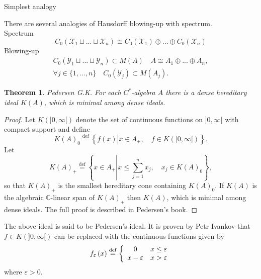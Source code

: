 \documentclass{beamer}
\theoremstyle{plain}
\newtheorem{empt}{}
\newtheorem{thm}{Theorem}%
\newcommand{\be}{\begin{equation}}
\newcommand{\ee}{\end{equation}}
\newcommand{\C}{\mathbb{C}}
\newcommand{\eps}{\varepsilon}                    %
\newcommand{\sX}{\mathcal{X}}       %
\newcommand{\sY}{\mathcal{Y}}       %
\newcommand{\bean}{\begin{eqnarray*}}
\newcommand{\eean}{\end{eqnarray*}}
\newcommand{\bydef}{\stackrel{\mathrm{def}}{=}}
\begin{document}
\begin{frame}
	\begin{center}
	{\huge{Simplest analogy} }%
	\end{center}
There are several  analogies of Hausdorff blowing-up  with spectrum.\\
Spectrum
$$
C_0\left(\sX_1\sqcup ...\sqcup \sX_n \right) \cong C_0\left(\sX_1 \right) \oplus ...\oplus C_0\left(\sX_n \right) 
$$
Blowing-up
\bean
C_0\left( \sY_1\sqcup ...\sqcup \sY_n\right)\subset M\left( A\right)\quad   
A \cong A_1\oplus ...\oplus A_n,\\
\forall j \in \{1,...,n\}\quad C_0\left(\sY_j \right) \subset M\left(A_j \right). 
\eean
\end{frame}
\begin{frame}
	\begin{thm}\label{pedersen_ideal_thm} \alert{Pedersen G.K.}
		For each $C^*$-algebra $A$ there is a dense hereditary ideal $K(A)$,
		which is minimal among dense ideals.
		
	\end{thm}
	\begin{proof}
		Let $K(]0, \infty [)$ denote the set of continuous functions on $]0, \infty [$ with 
		compact support and define 
		\be\label{pedersen_k0_eqn}
		K\left( A \right)_0 \bydef \left\{f\left(x\right) \left|x \in A_+, \quad f \in K(]0, \infty [) \right.\right\}.
		\ee
		Let 
		\be\label{pedersen_k_plus_eqn}
		K\left( A \right)_+ \bydef \left\{x \in A_+ \left|x \le \sum_{j = 1}^nx_j, \quad x_j \in  	K\left( A \right)_0\right.\right\}, 	
		\ee
		so that $	K\left( A \right)_+$ is the smallest hereditary cone  containing $K\left( A \right)_0$. If $K(A)$ 
		is  the algebraic  $\C$-linear span of $K(A)_+$ then $K(A)$,
		which is minimal among dense ideals. The full  proof is  described in Pedersen's book.
	\end{proof}
	
\end{frame}

\begin{frame}
	The above ideal is said to be \alert{Pedersen's ideal}. It is  proven by \alert{Petr Ivankov} that $f \in K(]0, \infty [)$ can be replaced with the continuous functions given by
		$$
		f_\eps\left( x\right)  \bydef\left\{
		\begin{array}{c l}
			0 &x \le \eps \\
			x - \eps & x > \eps
		\end{array}\right.
	$$
	where $\eps > 0$.
\end{frame}
\end{document}

